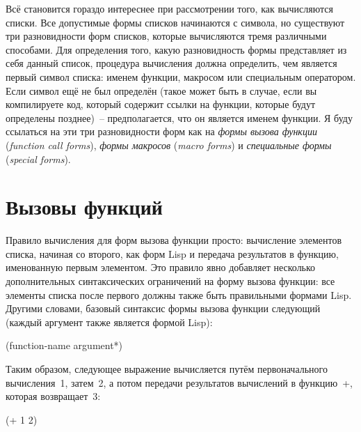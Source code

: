 Всё становится гораздо интереснее при рассмотрении того, как вычисляются списки. Все
допустимые формы списков начинаются с символа, но существуют три разновидности форм
списков, которые вычисляются тремя различными способами. Для определения того, какую
разновидность формы представляет из себя данный список, процедура вычисления должна
определить, чем является первый символ списка: именем функции, макросом или специальным
оператором. Если символ ещё не был определён (такое может быть в случае, если вы
компилируете код, который содержит ссылки на функции, которые будут определены позднее)~--
предполагается, что он является именем функции. Я буду ссылаться на эти три разновидности форм как на \textit{формы
  вызова функции} (\textit{function call forms}), \textit{формы макросов} (\textit{macro
  forms}) и \textit{специальные формы} (\textit{special forms}).

\section{Вызовы функций}

Правило вычисления для форм вызова функции просто: вычисление элементов списка, начиная со
второго, как форм Lisp и передача результатов в функцию, именованную первым элементом. Это
правило явно добавляет несколько дополнительных синтаксических ограничений на форму вызова
функции: все элементы списка после первого должны также быть правильными формами
Lisp. Другими словами, базовый синтаксис формы вызова функции следующий (каждый аргумент
также является формой Lisp):

\begin{myverb}
(function-name argument*)
\end{myverb}

Таким образом, следующее выражение вычисляется путём первоначального вычисления~1,
затем~2, а потом передачи результатов вычислений в функцию~+, которая возвращает~3:

\begin{myverb}
(+ 1 2)
\end{myverb}

